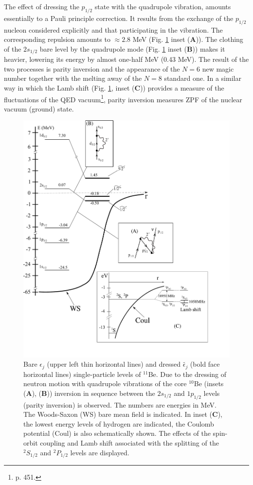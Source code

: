   
   The effect of dressing the $p_{1/2}$ state with the quadrupole vibration, amounts essentially to a Pauli principle correction. It results from the exchange of the $p_{1/2}$ nucleon considered explicitly and that participating in the vibration. The corresponding repulsion amounts to
    $\approx 2.8$ MeV (Fig. \ref{fig6.2.1x}  inset (\textbf{A})).  
  The clothing of the $2s_{1/2}$ bare level by the quadrupole mode
  (Fig. \ref{fig6.2.1x} inset (\textbf{B})) makes it  heavier, 
  lowering its energy by almost one-half MeV (0.43 MeV). The result of the two processes  
  is parity inversion  and the  appearance of  the $N=6$ new magic number together with the melting 
  away of the $N=8$ standard one.
  In a similar way  in which the Lamb shift  (Fig. \ref{fig6.2.1x}, inset (\textbf{C}))  provides a measure 
  of  the fluctuations of the QED vacuum\footnote{\cite{Pais:86} p. 451.},  parity inversion 
  measures ZPF of the nuclear vacuum (ground) state. 
  \begin{figure}
  	\centerline{\includegraphics*[width=12cm,angle=0]{C8/figsC8/Fig6_2_1}}
  	\caption{ Bare $\epsilon_j$ (upper left  thin horizontal lines) and dressed $\tilde{\epsilon_j}$ (bold face horizontal lines)
  		single-particle levels of $^{11}$Be. Due to the dressing of neutron motion with  quadrupole vibrations
  		of the core $^{10}$Be (insets (\textbf{A}), (\textbf{B}))  inversion in sequence between the 
  		$ 2s_{1/2}$ and $ 1p_{1/2}$ levels  (parity inversion) is observed. The numbers  are   energies in MeV. The Woods-Saxon (WS) bare mean field is indicated.
  		In inset (\textbf{C}), the lowest energy levels of hydrogen 
  		are indicated, the Coulomb potential (Coul) is also schematically shown.
  		The effects of the spin-orbit coupling and Lamb shift associated with the splitting of the 
  		$^2S_{1/2}$ and $^2P_{1/2}$ levels are displayed.}\label{fig6.2.1x}
  \end{figure} 
